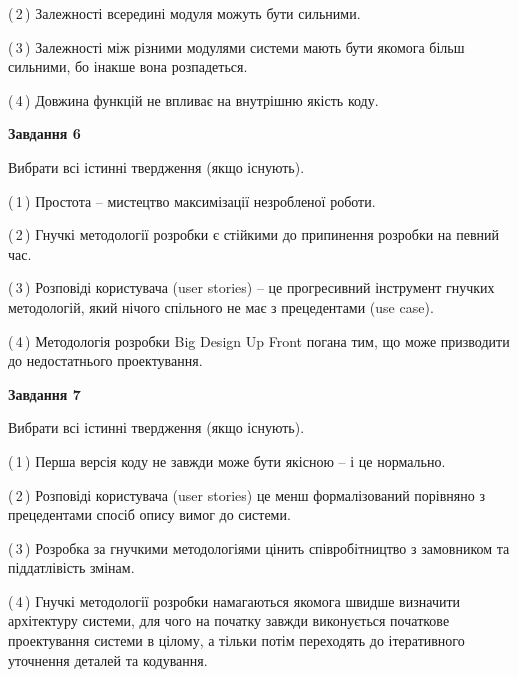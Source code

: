 \documentclass[10pt, ukrainian]{article}
\begin{document}
{\begin {large}
(\,2\,) Залежності всередині модуля можуть бути сильними. %



(\,3\,) Залежності між різними модулями системи мають бути якомога більш сильними, бо інакше вона розпадеться. %



(\,4\,) Довжина функцій не впливає на внутрішню якість коду. %

\newpage

{\begin {center}\textbf{Завдання 6}\end {center}}\par
Вибрати всі істинні твердження (якщо існують).\par
\vspace{2mm}



(\,1\,) Простота – мистецтво максимізації незробленої роботи. %



(\,2\,) Гнучкі методології розробки є стійкими до припинення розробки на певний час. %



(\,3\,) Розповіді користувача (user stories) – це прогресивний інструмент гнучких методологій, який нічого спільного не має з прецедентами (use case). %



(\,4\,) Методологія розробки Big Design Up Front погана тим, що може призводити до недостатнього проектування.%


{\begin {center}\textbf{Завдання 7}\end {center}}\par
Вибрати всі істинні твердження (якщо існують).\par
\vspace{2mm}



(\,1\,) Перша версія коду не завжди може бути якісною -- і це нормально. %



(\,2\,) Розповіді користувача (user stories) це менш формалізований порівняно з прецедентами спосіб опису вимог до системи. %



(\,3\,) Розробка за гнучкими методологіями цінить співробітництво з замовником та піддатлівість змінам. %



(\,4\,) Гнучкі методології розробки намагаються якомога швидше визначити архітектуру системи, для чого на початку завжди виконується початкове проектування системи в цілому, а тільки потім переходять до ітеративного уточнення деталей та кодування. %



\end{large}}
\end{document}
